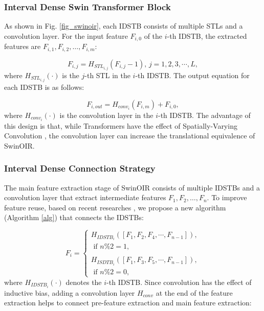 \documentclass[default,iicol]{sn-jnl}
\theoremstyle{thmstyleone}\newtheorem{theorem}{Theorem}\newtheorem{proposition}[theorem]{Proposition}
\theoremstyle{thmstyletwo}\newtheorem{example}{Example}\newtheorem{remark}{Remark}\theoremstyle{thmstylethree}\newtheorem{definition}{Definition}
\begin{document}
\subsubsection{Interval Dense Swin Transformer Block}
As shown in Fig. \ref{fig_swinoir}, each IDSTB consists of multiple STLs and a convolution layer. For the input feature $F_{i,0}$ of the $i$-th IDSTB, the extracted features are $F_{i,1},F_{i,2}, \ldots, F_{i,m}$:

\begin{equation}
F_{i,j}=H_{\textit{STL}_{i,j}}(F_{i,j}-1),\, j=1,2,3,\cdots,L,
\end{equation}
where $H_{\textit{STL}_{i,j}}(\cdot)$ is the $j$-th STL in the $i$-th IDSTB. The output equation for each IDSTB is as follows:

\begin{equation}
F_{i,out}=H_{\textit{conv}_i}(F_{i,m})+F_{i,0},
\end{equation}
where $H_{conv_i}(\cdot)$ is the convolution layer in the $i$-th IDSTB. The advantage of this design is that, while Transformers have the effect of Spatially-Varying Convolution \cite{vaswani2021scaling}\cite{elsayed2020revisiting}, the convolution layer can increase the translational equivalence of SwinOIR.

\subsubsection{Interval Dense Connection Strategy}
The main feature extraction stage of SwinOIR consists of multiple IDSTBs and a convolution layer that extract intermediate features $F_{1},F_2, \ldots, F_n$. To improve feature reuse, based on recent researches \cite{ju2022threshnet}\cite{ju2023efficient}, we propose a new algorithm (Algorithm \ref{alg}) that connects the IDSTBs:

\begin{equation}
F_i=\left\{\begin{array}{c}
H_{\textit{IDSTB}_i}\left(\left[F_1, F_2, F_4, \cdots, F_{n-1}\right]\right),\\
\text { if } n \% 2=1,\\
\\
H_{\textit{ISDTB}_i}\left(\left[F_1, F_3, F_5, \cdots, F_{n-1}\right]\right),\\
\text { if } n \% 2=0,
\end{array}\right.
\end{equation}
where $H_{\textit{IDSTB}_{i}}(\cdot)$ denotes the $i$-th IDSTB. Since convolution has the effect of inductive bias, adding a convolution layer $H_{\textit{conv}}$ at the end of the feature extraction helps to connect pre-feature extraction and main feature extraction:
\end{document}
